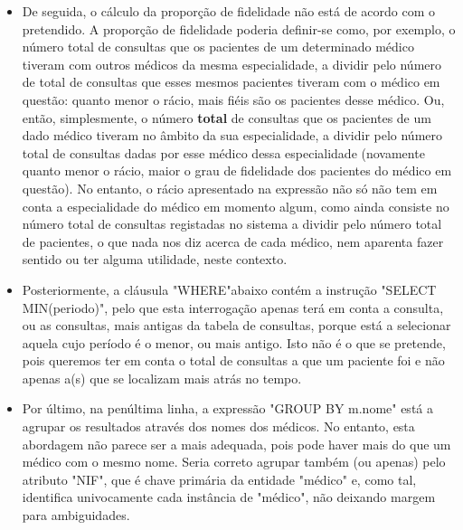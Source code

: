 \documentclass[12pt,a4paper]{article}
\begin{document}
\begin{enumerate}
\begin{itemize}
        \item De seguida, o cálculo da proporção de fidelidade não está de acordo com o pretendido. A proporção de fidelidade poderia definir-se como, por exemplo, o número total de consultas que os pacientes de um determinado médico tiveram com outros médicos da mesma especialidade, a dividir pelo número de total de consultas que esses mesmos pacientes tiveram com o médico em questão: quanto menor o rácio, mais fiéis são os pacientes desse médico. Ou, então, simplesmente, o número \textbf{total} de consultas que os pacientes de um dado médico tiveram no âmbito da sua especialidade, a dividir pelo número total de consultas dadas por esse médico dessa especialidade (novamente quanto menor o rácio, maior o grau de fidelidade dos pacientes do médico em questão). No entanto, o rácio apresentado na expressão não só não tem em conta a especialidade do médico em momento algum, como ainda consiste no número total de consultas registadas no sistema a dividir pelo número total de pacientes, o que nada nos diz acerca de cada médico, nem aparenta fazer sentido ou ter alguma utilidade, neste contexto.
        \item Posteriormente, a cláusula \ttfamily "WHERE"\rmfamily abaixo contém a instrução \ttfamily "SELECT MIN(periodo)", \rmfamily pelo que esta interrogação apenas terá em conta a consulta, ou as consultas, mais antigas da tabela de consultas, porque está a selecionar aquela cujo período é o menor, ou mais antigo. Isto não é o que se pretende, pois queremos ter em conta o total de consultas a que um paciente foi e não apenas a(s) que se localizam mais atrás no tempo.
        \item Por último, na penúltima linha, a expressão \ttfamily "GROUP BY m.nome" \rmfamily está a agrupar os resultados através dos nomes dos médicos. No entanto, esta abordagem não parece ser a mais adequada, pois pode haver mais do que um médico com o mesmo nome. Seria correto agrupar também (ou apenas) pelo atributo "NIF", que é chave primária da entidade "médico" e, como tal, identifica univocamente cada instância de "médico", não deixando margem para ambiguidades. %
    \end{itemize}
    
  \end{enumerate}
\end{document}
